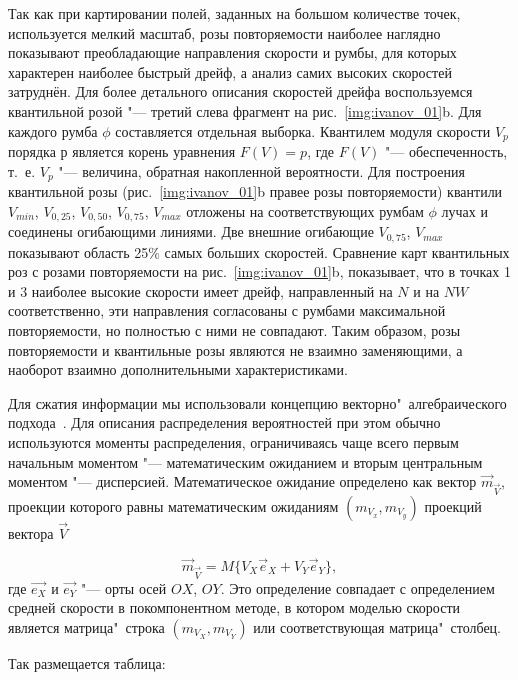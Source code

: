 Так как при картировании полей, заданных на большом количестве точек, используется мелкий масштаб, розы повторяемости наиболее наглядно показывают   преобладающие направления скорости и румбы, для которых характерен наиболее быстрый дрейф, а анализ самих высоких скоростей затруднён. Для более детального описания скоростей дрейфа воспользуемся квантильной розой "--- третий слева фрагмент на рис.~\ref{img:ivanov_01}b. Для каждого румба $\phi$ составляется отдельная выборка. Квантилем модуля скорости $V_p$ порядка $р$ является корень уравнения $F(V)=p$, где $F(V)$ "--- обеспеченность, т.~е. $V_p$ "--- величина, обратная накопленной вероятности. Для построения квантильной розы (рис.~\ref{img:ivanov_01}b правее розы повторяемости) квантили $V_{min}$, $V_{0,25}$, $V_{0,50}$, $V_{0,75}$, $V_{max}$  отложены на соответствующих румбам $\phi$ лучах и соединены огибающими линиями. Две внешние огибающие $V_{0,75}$, $V_{max}$ показывают область 25$\%$ самых больших скоростей. Сравнение карт квантильных роз с розами повторяемости на рис.~\ref{img:ivanov_01}b, показывает, что в точках 1 и 3 наиболее высокие скорости имеет дрейф,  направленный на $N$ и на $NW$ соответственно, эти направления согласованы с румбами максимальной повторяемости, но полностью с ними не совпадают. Таким образом, розы повторяемости и квантильные розы являются не взаимно заменяющими, а наоборот взаимно дополнительными характеристиками.

Для сжатия информации мы использовали концепцию векторно"~алгебраического подхода~\cite{Belyshev1983}. Для описания распределения вероятностей при этом обычно используются моменты распределения, ограничиваясь чаще всего первым начальным моментом "--- математическим ожиданием и вторым центральным моментом "--- дисперсией. Математическое ожидание определено как вектор $\vec{m}_{\vec{V}}$, проекции которого равны математическим ожиданиям $(m_{V_x},m_{V_y})$ проекций вектора $\vec{V}$

\begin{equation}
\label{eq:equation3_1}
\vec{m}_{\vec{V}}=M\{V_X\vec{e}_X+V_Y\vec{e}_Y\},
\end{equation}
где $\vec{e_X}$ и $\vec{e_Y}$ "--- орты осей $OX$, $OY$. Это определение совпадает с определением средней скорости в покомпонентном методе, в котором моделью скорости является матрица"~строка $(m_{V_X},m_{V_Y})$ или соответствующая матрица"~столбец.

Так размещается таблица:

